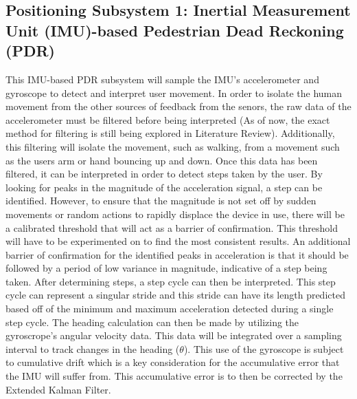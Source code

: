 \documentclass{article}
\begin{document}
\subsection{Positioning Subsystem 1: Inertial Measurement Unit (IMU)-based Pe\-destrian Dead Reckoning (PDR)}
This IMU-based PDR subsystem will sample the IMU's accelerometer and gyroscope to detect and interpret user movement. In order to isolate the human movement from the other sources of feedback from the senors, the raw data of the accelerometer must be filtered before being interpreted (As of now, the exact method for filtering is still being explored in Literature Review). Additionally, this filtering will isolate the movement, such as walking, from a movement such as the users arm or hand bouncing up and down. Once this data has been filtered, it can be interpreted in order to detect steps taken by the user. By looking for peaks in the magnitude of the acceleration signal, a step can be identified. However, to ensure that the magnitude is not set off by sudden movements or random actions to rapidly displace the device in use, there will be a calibrated threshold that will act as a barrier of confirmation. This threshold will have to be experimented on to find the most consistent results. An additional barrier of confirmation for the identified peaks in acceleration is that it should be followed by a period of low variance in magnitude, indicative of a step being taken. After determining steps, a step cycle can then be interpreted. This step cycle can represent a singular stride and this stride can have its length predicted based off of the minimum and maximum acceleration detected during a single step cycle. The heading calculation can then be made by utilizing the gyroscrope's angular velocity data. This data will be integrated over a sampling interval to track changes in the heading ($\theta$). This use of the gyroscope is subject to cumulative drift which is a key consideration for the accumulative error that the IMU will suffer from. This accumulative error is to then be corrected by the Extended Kalman Filter.
\end{document}
